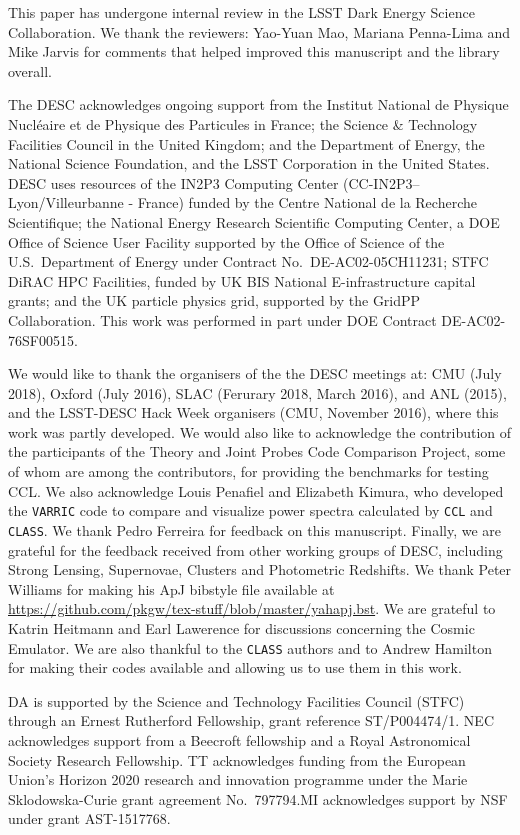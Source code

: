 %
This paper has undergone internal review in the LSST Dark Energy Science Collaboration. We thank the reviewers: Yao-Yuan Mao, Mariana Penna-Lima and Mike Jarvis for comments that helped improved this manuscript and the \ccl library overall. 

The DESC acknowledges ongoing support from the Institut National de Physique Nucl\'eaire et de Physique des Particules in France; the Science \& Technology Facilities Council in the United Kingdom; and the Department of Energy, the National Science Foundation, and the LSST Corporation in the United States.  DESC uses resources of the IN2P3 Computing Center (CC-IN2P3--Lyon/Villeurbanne - France) funded by the Centre National de la Recherche Scientifique; the National Energy Research Scientific Computing Center, a DOE Office of Science User Facility supported by the Office of Science of the U.S.\ Department of Energy under Contract No.\ DE-AC02-05CH11231; STFC DiRAC HPC Facilities, funded by UK BIS National E-infrastructure capital grants; and the UK particle physics grid, supported by the GridPP Collaboration.  This work was performed in part under DOE Contract DE-AC02-76SF00515. 

We would like to thank the organisers of the the DESC meetings at: CMU (July 2018), Oxford (July 2016), SLAC (Ferurary 2018, March 2016), and ANL (2015), and the LSST-DESC Hack Week organisers (CMU, November 2016), where this work was partly developed. We would also like to acknowledge the contribution of the participants of the Theory and Joint Probes Code Comparison Project, some of whom are among the \ccl contributors, for providing the benchmarks for testing CCL. We also acknowledge Louis Penafiel and Elizabeth Kimura, who developed the {\tt VARRIC} code to compare and visualize power spectra calculated by {\tt CCL} and {\tt CLASS}. We thank Pedro Ferreira for feedback on this manuscript. Finally, we are grateful for the feedback received from other working groups of DESC, including Strong Lensing, Supernovae, Clusters and Photometric Redshifts.
We thank Peter Williams for making his ApJ bibstyle file available at \url{https://github.com/pkgw/tex-stuff/blob/master/yahapj.bst}. We are grateful to Katrin Heitmann and Earl Lawerence for discussions concerning the Cosmic Emulator. We are also thankful to the {\tt CLASS} authors and to Andrew Hamilton for making their codes available and allowing us to use them in this work. 
%

DA is supported by the Science and Technology Facilities Council (STFC) through an Ernest Rutherford Fellowship, grant reference ST/P004474/1. NEC acknowledges support from a Beecroft fellowship and a Royal Astronomical Society Research Fellowship. TT acknowledges funding from the European Union's Horizon 2020 research and innovation programme under the Marie Sk{l}odowska-Curie grant agreement No.\ 797794.MI acknowledges support by NSF under grant AST-1517768.

